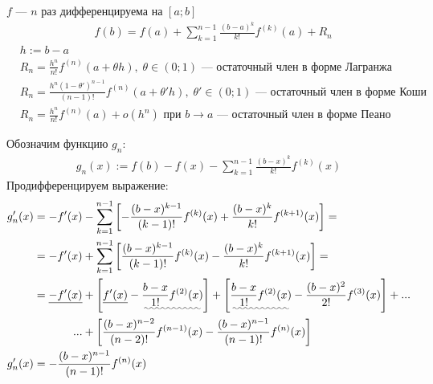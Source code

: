 \documentclass{article}
\begin{document}


$f$ --- $n$ раз дифференцируема на $[a;b]$
\begin{align*}
	 & f(b)=f(a)+\sum_{k=1}^{n-1}\frac{(b-a)^{k}}{k!}f^{(k)}(a)+R_n
\end{align*}
\begin{align*}
	 & h:=b-a                                                                                                                  \\
	 & R_n=\frac{h^n}{n!}f^{(n)}(a+\theta h),\;\theta\in(0;1)\text{ --- остаточный член в форме Лагранжа }                     \\
	 & R_n=\frac{h^{n}(1-\theta')^{n-1}}{(n-1)!}f^{(n)}(a+\theta'h),\;\theta'\in(0;1)\text{ --- остаточный член в форме Коши } \\
	 & R_n=\frac{h^{n}}{n!}f^{(n)}(a)+o(h^{n})\text{ при $b\to a$ --- остаточный член в форме Пеано }
\end{align*}

\proof

Обозначим функцию $g_n$:
\begin{align*}
	g_n(x):=f(b)-f(x)-\sum_{k=1}^{n-1}\frac{(b-x)^{k}}{k!}f^{(k)}(x)
\end{align*}
Продифференцируем выражение:
\begin{align*}
	g_n'(x)
	 & =-f'(x)-\sum_{k=1}^{n-1}\left[-\frac{(b-x)^{k-1}}{(k-1)!}f^{(k)}(x)+\frac{(b-x)^{k}}{k!}f^{(k+1)}(x)\right]=                                                                                                                          \\
	 & =-f'(x)+\sum_{k=1}^{n-1}\left[\frac{(b-x)^{k-1}}{(k-1)!}f^{(k)}(x)-\frac{(b-x)^{k}}{k!}f^{(k+1)}(x)\right]=                                                                                                                           \\
	 & =
	\begin{aligned}[t]
		\underline{-f'(x)} & +\left[\underline{f'(x)}-\uwave{\frac{b-x}{1!}f^{(2)}(x)}\right]+\left[\uwave{\frac{b-x}{1!}f^{(2)}(x)}-\frac{(b-x)^{2}}{2!}f^{(3)}(x)\right]+... \\
		...                & +\left[\frac{(b-x)^{n-2}}{(n-2)!}f^{(n-1)}(x)-\frac{(b-x)^{n-1}}{(n-1)!}f^{(n)}(x)\right]
	\end{aligned} \\
	g_n'(x)
	 & =-\frac{(b-x)^{n-1}}{(n-1)!}f^{(n)}(x)
\end{align*}
\end{document}
